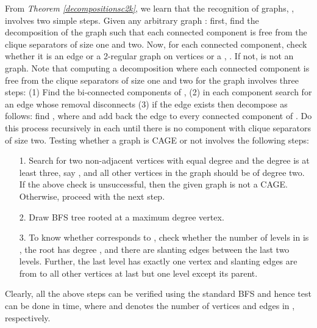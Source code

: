 \documentclass[runningheads]{llncs}
\begin{document}
\noindent From \emph{Theorem \ref{decompositionsc2k}}, we learn that the recognition of  graphs, , involves two simple steps. Given any arbitrary graph : first, find the decomposition of the graph  such that each connected component is free from the clique separators of size one and two. Now, for each connected component, check whether it is an edge or a 2-regular graph on  vertices or a , . If not,  is not an  graph. Note that computing a decomposition where each connected component is free from the clique separators of size one and two for the graph  involves three steps: (1) Find the bi-connected components of , (2) in each component  search for an edge  whose removal disconnects  (3) if the edge  exists then decompose  as follows: find , where  and add back the edge  to every connected component of . Do this process recursively in each  until there is no component with clique separators of size two. Testing whether a graph is CAGE or not involves the following steps:
\begin{itemize}
\item[1.] Search for two non-adjacent vertices with equal degree and the degree is at least three, say , and all other vertices in the graph should be of degree two. If the above check is unsuccessful, then the given graph is not a CAGE. Otherwise, proceed with the next step. 
\item[2.] Draw BFS tree  rooted at a maximum degree vertex.
\item[3.] To know whether  corresponds to , check whether the number of levels in  is , the root has degree , and there are  slanting edges between the last two levels. Further, the last level has exactly one vertex and  slanting edges are from  to all other vertices at last but one level except its parent. 
\end{itemize}

Clearly, all the above steps can be verified using the standard BFS and hence test can be done in  time, where  and  denotes the number of vertices and edges in , respectively. 
\end{document}
